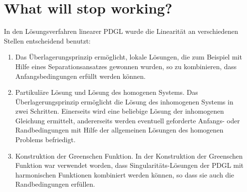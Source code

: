 %
%
%
\section{What will stop working?}
In den Lösungsverfahren linearer PDGL wurde die Linearität an verschiedenen
Stellen entscheidend benutzt:
\begin{enumerate}
\item
Das Überlagerungsprinzip ermöglicht, lokale Lösungen, die zum Beispiel
mit Hilfe eines Separationsansatzes gewonnen wurden, so zu kombinieren, dass
Anfangsbedingungen erfüllt werden können.
\item
Partikuläre Lösung und Lösung des homogenen Systems.
Das Überlagerungsprinzip ermöglicht die Lösung des inhomogenen Systems
in zwei Schritten. Einerseits wird eine beliebige Lösung der inhomogenen
Gleichung ermittelt, andererseits werden eventuell geforderte Anfangs-
oder Randbedingungen mit Hilfe der allgemeinen Lösungen des homogenen
Problems befriedigt.
\item
Konstruktion der Greenschen Funktion. In der Konstruktion der
Greenschen Funktion war verwendet worden, dass Singularitäts-Lösungen 
der PDGL mit harmonischen Funktionen kombiniert werden können, so 
dass sie auch die Randbedingungen erfüllen.
\end{enumerate}

